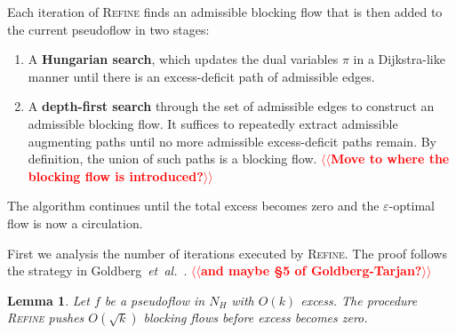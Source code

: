 \documentclass[11pt]{article}
\makeatletter
\def\etal{\textit{et~al.}}
\def\eps{\varepsilon}
\theoremstyle{plain}
\newtheorem{lemma}{Lemma}[section]
\numberwithin{figure}{section}
\def\EMPH#1{\textbf{\boldmath #1}}
\def\n@te#1{\textsf{\boldmath \textbf{$\langle\!\langle$#1$\rangle\!\rangle$}}\leavevmode}
\def\note#1{\textcolor{red}{\n@te{#1}}}
\makeatother
\begin{document}
Each iteration of \textsc{Refine} finds an admissible blocking flow that is then added to the current pseudoflow in two stages:
\begin{enumerate}
\item
A \EMPH{Hungarian search}, which updates the dual variables $\pi$ in a Dijkstra-like manner until there is an excess-deficit path of admissible edges.
\item
A \EMPH{depth-first search} through the set of admissible edges to construct an admissible blocking flow.
It suffices to repeatedly extract admissible augmenting paths until no more admissible excess-deficit paths remain.
By definition, the union of such paths is a blocking flow. \note{Move to where the blocking flow is introduced?}
\end{enumerate}
The algorithm continues until the total excess becomes zero and the $\eps$-optimal flow is now a circulation.

First we analysis the number of iterations executed by \textsc{Refine}.
The proof follows the strategy in Goldberg~\etal~\cite[Section~3.2]{GHKT17}. \note{and maybe \S5 of Goldberg-Tarjan?}


\begin{lemma}
\label{lemma:goldberg_refine_iterations}
Let $f$ be a pseudoflow in $N_H$ with $O(k)$ excess.
The procedure \textsc{Refine} pushes $O(\sqrt{k})$ blocking flows before excess becomes zero.
\end{lemma}
\end{document}
